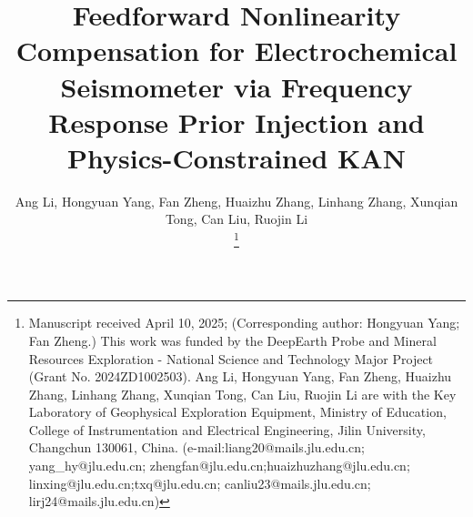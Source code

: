 \documentclass[journal]{IEEEtranTIE}
\begin{document}
\title{
    Feedforward Nonlinearity Compensation for Electrochemical Seismometer via Frequency Response Prior Injection and Physics-Constrained KAN}

\author{
    Ang Li, Hongyuan Yang, Fan Zheng, Huaizhu Zhang, Linhang Zhang, Xunqian Tong, Can Liu, Ruojin Li

    \thanks{
		Manuscript received April 10, 2025; (Corresponding author: Hongyuan Yang; Fan Zheng.)
        This work was funded by the DeepEarth Probe and Mineral Resources Exploration - National Science and Technology Major Project (Grant No. 2024ZD1002503).
		Ang Li, Hongyuan Yang, Fan Zheng, Huaizhu Zhang, Linhang Zhang, Xunqian Tong, Can Liu, Ruojin Li are with the Key Laboratory of Geophysical Exploration Equipment, Ministry of Education, College of Instrumentation and Electrical Engineering, Jilin University, Changchun 130061, China. (e-mail:liang20@mails.jlu.edu.cn; yang\_hy@jlu.edu.cn; zhengfan@jlu.edu.cn;huaizhuzhang@jlu.edu.cn; linxing@jlu.edu.cn;txq@jlu.edu.cn; canliu23@mails.jlu.edu.cn; lirj24@mails.jlu.edu.cn)
	}
}

\maketitle
\end{document}

